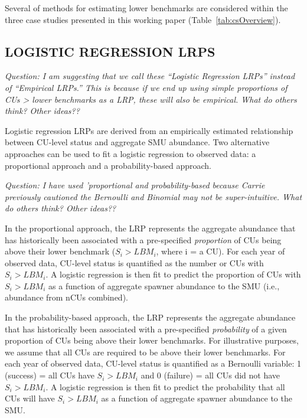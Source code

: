 \documentclass[11pt]{book}
\begin{document}
Several of methods for estimating lower benchmarks are considered within the three case studies presented in this working paper (Table~\ref{tab:csOverview}).

\hypertarget{logistic-regression-lrps}{%
\subsection{LOGISTIC REGRESSION LRPS}\label{logistic-regression-lrps}}

\emph{Question: I am suggesting that we call these ``Logistic Regression LRPs'' instead of ``Empirical LRPs.'' This is because if we end up using simple proportions of CUs \textgreater{} lower benchmarks as a LRP, these will also be empirical. What do others think? Other ideas??}

Logistic regression LRPs are derived from an empirically estimated relationship between CU-level status and aggregate SMU abundance. Two alternative approaches can be used to fit a logistic regression to observed data: a proportional approach and a probability-based approach.

\emph{Question: I have used 'proportional and probability-based because Carrie previously cautioned the Bernoulli and Binomial may not be super-intuitive. What do others think? Other ideas??}

In the proportional approach, the LRP represents the aggregate abundance that has historically been associated with a pre-specified \emph{proportion} of CUs being above their lower benchmark (\(S_i > LBM_i\), where i = a CU). For each year of observed data, CU-level status is quantified as the number or CUs with \(S_i > LBM_i\). A logistic regression is then fit to predict the proportion of CUs with \(S_i > LBM_i\) as a function of aggregate spawner abundance to the SMU (i.e., abundance from nCUs combined).

In the probability-based approach, the LRP represents the aggregate abundance that has historically been associated with a pre-specified \emph{probability} of a given proportion of CUs being above their lower benchmarks. For illustrative purposes, we assume that all CUs are required to be above their lower benchmarks. For each year of observed data, CU-level status is quantified as a Bernoulli variable: 1 (success) = all CUs have \(S_i > LBM_i\) and 0 (failure) = all CUs did not have \(S_i > LBM_i\). A logistic regression is then fit to predict the probability that all CUs will have \(S_i > LBM_i\) as a function of aggregate spawner abundance to the SMU.
\end{document}
